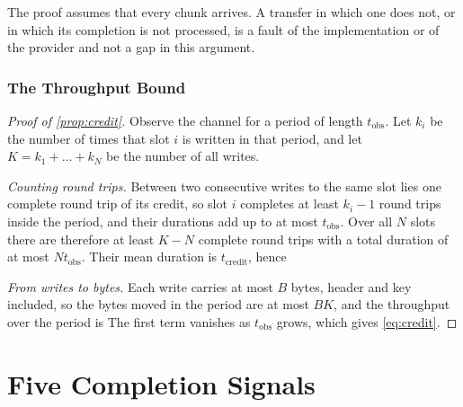 The proof assumes that every chunk arrives. A transfer in which one does
not, or in which its completion is not processed, is a fault of the
implementation or of the provider and not a gap in this argument.

\subsubsection{The Throughput Bound}

\begin{proof}[Proof of \cref{prop:credit}]
Observe the channel for a period of length $t_{\text{obs}}$. Let $k_i$ be the
number of times that slot $i$ is written in that period, and let
$K = k_1 + \dots + k_N$ be the number of all writes.

\emph{Counting round trips.} Between two consecutive writes to the same slot
lies one complete round trip of its credit, so slot $i$ completes at least
$k_i - 1$ round trips inside the period, and their durations add up to at
most $t_{\text{obs}}$. Over all $N$ slots there are therefore at least
$K - N$ complete round trips with a total duration of at most
$N t_{\text{obs}}$. Their mean duration is $t_{\text{credit}}$, hence

\emph{From writes to bytes.} Each write carries at most $B$ bytes, header and
key included, so the bytes moved in the period are at most $B K$, and the
throughput over the period is
The first term vanishes as $t_{\text{obs}}$ grows, which gives
\cref{eq:credit}.
\end{proof}

\section{Five Completion Signals}
\label{sec:signals}

